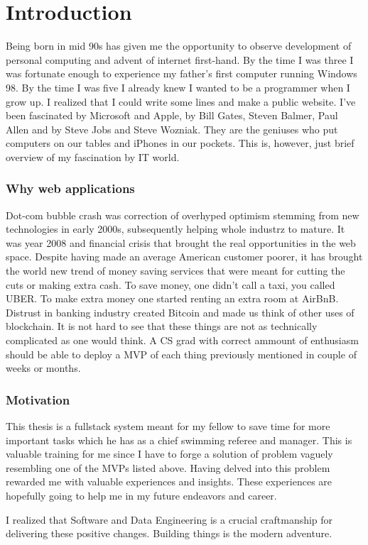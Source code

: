 \chapter*{Introduction}
\par
Being born in mid 90s has given me the  opportunity to observe development of personal computing and advent of internet first-hand. By the time I was three I was fortunate enough to experience my father's first computer running Windows 98. By the time I was five I already knew I wanted to be a programmer when I grow up. I realized that I could write some lines and make a public website. I've been fascinated by Microsoft and Apple, by Bill Gates, Steven Balmer, Paul Allen and by Steve Jobs and Steve Wozniak. They are the geniuses who put computers on our tables and iPhones in our pockets. This is, however, just brief overview of my fascination by IT world.
\subsection*{Why web applications}
\par
Dot-com bubble crash was correction of overhyped optimism stemming from new technologies in early 2000s, subsequently helping whole industrz to mature. It was year 2008 and financial crisis that brought the real opportunities in the web space. Despite having made an average American customer poorer, it has brought the world new trend of money saving services that were meant for cutting the cuts or making extra cash. To save money, one didn't call a taxi, you called UBER. To make extra money one started renting an extra room at AirBnB. Distrust in banking industry created Bitcoin and made us think of other uses of blockchain. It is not hard to see that these things are not as technically complicated as one would think. A CS grad with correct ammount of enthusiasm should be able to deploy a MVP of each thing previously mentioned in couple of weeks or months.
\subsection*{Motivation}
\par
This thesis is a fullstack system meant for my fellow to save time for more important tasks which he has as a chief swimming referee and manager. This is valuable training for me since I have to forge a solution of problem vaguely resembling one of the MVPs listed above. Having delved into this problem rewarded me with valuable experiences and insights. These experiences are hopefully going to help me in my future endeavors and career.
\par
I realized that Software and Data Engineering is a crucial craftmanship for delivering these positive changes. Building things is the modern adventure.
